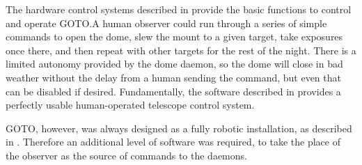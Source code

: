 
\begin{colsection}

The hardware control systems described in  provide the basic functions to control and operate GOTO.\@ A human observer could run through a series of simple commands to open the dome, slew the mount to a given target, take exposures once there, and then repeat with other targets for the rest of the night. There is a limited autonomy provided by the dome daemon, so the dome will close in bad weather without the delay from a human sending the command, but even that can be disabled if desired. Fundamentally, the software described in  provides a perfectly usable human-operated telescope control system.

GOTO, however, was always designed as a fully robotic installation, as described in . Therefore an additional level of software was required, to take the place of the observer as the source of commands to the daemons.

\end{colsection}


